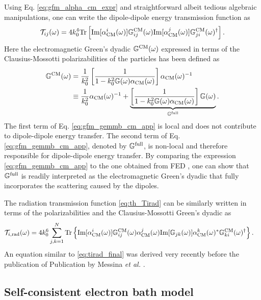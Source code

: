 Using Eq. \eqref{eq:gfm_alpha_cm_expr} and straightforward albeit tedious algebraic manipulations, one can write the dipole-dipole energy transmission function as
\begin{equation}
   \mathcal{T}_{ij}(\omega) = 4 k_0^4 \textrm{Tr} \left[ \textrm{Im}[\alpha^i_{\textrm{CM}}(\omega)] {\mathbb{G}}^{\textrm{CM}}_{ij}(\omega) \textrm{Im}[\alpha^j_{\textrm{CM}}(\omega)] {\mathbb{G}}^{\textrm{CM}}_{ji}(\omega)^{\dagger}\right]. \label{eq:tij_final}
\end{equation}
Here the electromagnetic Green's dyadic ${\mathbb{G}}^{\textrm{CM}}(\omega)$ expressed in terms of the Clausius-Mossotti polarizabilities of the particles has been defined as 
\begin{alignat}{2}
 {\mathbb{G}}^{\textrm{CM}}(\omega) &= \frac{1}{k_0^2} \left[\frac{1}{1-k_0^2 \mathbb{G}(\omega)\alpha_{\textrm{CM}}(\omega)}\right] \alpha_{\textrm{CM}}(\omega)^{-1} \\
  &\equiv \frac{1}{k_0^2} \alpha_{\textrm{CM}}(\omega)^{-1} + \underbrace{ \left[\frac{1}{1-k_0^2 \mathbb{G}(\omega)\alpha_{\textrm{CM}}(\omega)} \right] \mathbb{G}(\omega)}_{{\mathbb{G}}^{\textrm{full}}}. \label{eq:gfm_gemmb_cm_app}
\end{alignat}
The first term of Eq. \eqref{eq:gfm_gemmb_cm_app} is local and does not contribute to dipole-dipole energy transfer. The second term of Eq. \eqref{eq:gfm_gemmb_cm_app}, denoted by ${\mathbb{G}}^{\textrm{full}}$, is non-local and therefore responsible for dipole-dipole energy transfer. By comparing the expression \eqref{eq:gfm_gemmb_cm_app} to the one obtained from FED \cite{benabdallah11}, one can show that ${\mathbb{G}}^{\textrm{full}}$ is readily interpreted as the electromagnetic Green's dyadic that fully incorporates the scattering caused by the dipoles. %

The radiation transmission function \eqref{eq:th_Tirad} can be similarly written in terms of the polarizabilities and the Clausius-Mossotti Green's dyadic as
\begin{alignat}{2}
 \mathcal{T}_{i,\textrm{rad}}(\omega) 
 &= 4 k_0^6 \sum_{j,k=1}^N \textrm{Tr}\left\{   \textrm{Im}[\alpha^i_{\textrm{CM}}(\omega)] {\mathbb{G}}^{\textrm{CM}}_{ij}(\omega) \alpha_{\textrm{CM}}^j(\omega) \textrm{Im}[\mathbb{G}_{jk}(\omega)] \alpha^k_{\textrm{CM}}(\omega)^* {\mathbb{G}}^{\textrm{CM}}_{ki}(\omega)^{\dagger} \right\}. \label{eq:tirad_final}
\end{alignat}
An equation similar to \eqref{eq:tirad_final} was derived very recently before the publication of Publication  by Messina \textit{et al.} \cite{messina13}.


\subsection{Self-consistent electron bath model}
